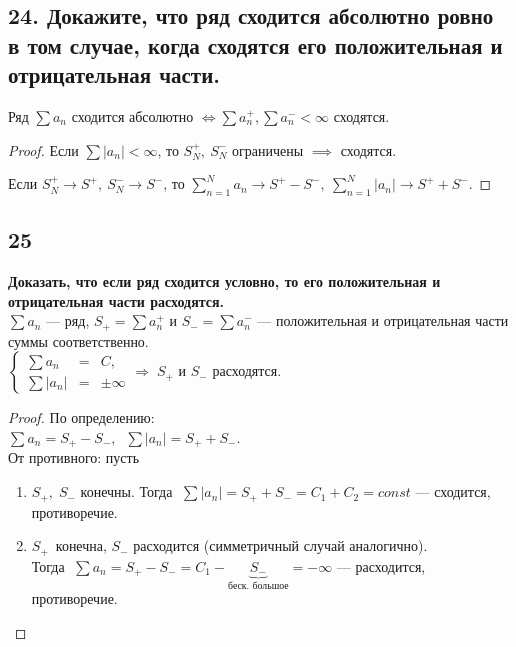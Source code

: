 \documentclass[a4paper, fleqn]{article}
\begin{document}
    \subsection*{24. Докажите, что ряд сходится абсолютно ровно в том случае, когда сходятся его положительная и отрицательная части.}
    \begin{proposition}
        Ряд $\sum a_n$ сходится абсолютно $\iff \sum a_n^+, \sum a_n^- < \infty$ сходятся. 
    \end{proposition}
    \begin{proof}
        Если $\sum \left|a_n\right| < \infty$, то $S_N^+,\ S_N^-$ ограничены $\implies$ сходятся.

        Если $S_N^+ \to S^+,\ S_N^- \to S^-$, то $\sum_{n=1}^N a_n \to S^+ - S^-,\ \sum_{n=1}^N \left|a_n\right| \to S^+ + S^-$.
    \end{proof}
        
    \subsection*{25}
        \textbf{ Доказать, что если ряд сходится условно, то его положительная и отрицательная части расходятся.} \\[5 pt]
    $\sum a_n$ --- ряд, $S_{+} = \sum a_n^{+}$ и $S_{-} = \sum a_n^{-}$
     --- положительная и отрицательная части суммы соответственно. \\[3 pt]
     $\left\{\begin{array}{lll} 
     \sum a_n &=& C,\\[5 pt]
     \sum |a_n| &=& \pm \infty
     \end{array}\right. \Rightarrow \; S_{+}$ и $S_{-}$ расходятся.
    \begin{proof}
    По определению: \\[3 pt]
    $\sum a_n = S_{+} - S_{-}, \;\; \sum |a_n| = S_{+} + S_{-}$. \\[3 pt]
    От противного: пусть\\[-20 pt]
    \begin{enumerate}
    \item $S_{+}, \; S_{-}$ конечны. Тогда $\;\sum |a_n| = S_{+} + S_{-} = C_1 + C_2 = const$ --- сходится, противоречие.
    \item $S_{+} \, $ конечна, $S_{-}$ расходится (симметричный случай аналогично). \\[0 pt]
    Тогда $\; \sum a_n = S_{+} - S_{-} = C_1 - \underbrace{S_{-}}_{\text{беск. большое}} = -\infty$ --- расходится, противоречие.
    \end{enumerate}
    \end{proof}    
        
\end{document}
